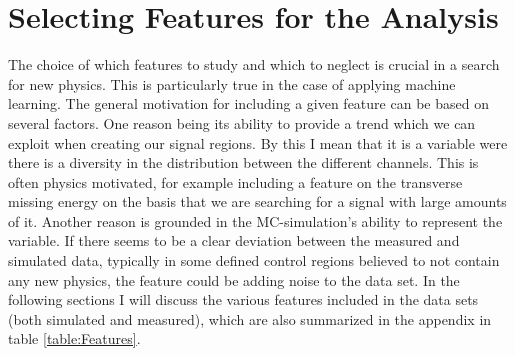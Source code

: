 \section{Selecting Features for the Analysis}\label{sec:Feats}
The choice of which features to study and which to neglect is crucial in a search for new physics. This is particularly true 
in the case of applying machine learning. The general motivation for including a given feature can be based on several factors. 
One reason being its ability to provide a trend which we can exploit when creating our signal regions. By this I mean
that it is a variable were there is a diversity in the distribution between the different channels. This is often physics motivated, for example 
including a feature on the transverse missing energy on the basis that we are searching for a signal with large amounts of it. 
Another reason is grounded in the \ac{MC}-simulation's ability to represent the variable. If there seems to be a clear deviation between the 
measured and simulated data, typically in some defined control regions believed to not contain any new physics, the feature could be adding noise 
to the data set. In the following sections I will discuss the various features included in the data sets (both simulated and measured), which are also 
summarized in the appendix in table \ref{table:Features}.